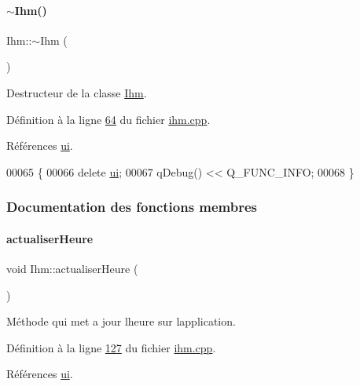 \paragraph{\texorpdfstring{$\sim$\+Ihm()}{~Ihm()}}
{\footnotesize\ttfamily Ihm\+::$\sim$\+Ihm (\begin{DoxyParamCaption}{ }\end{DoxyParamCaption})}



Destructeur de la classe \hyperlink{class_ihm}{Ihm}. 



Définition à la ligne \hyperlink{ihm_8cpp_source_l00064}{64} du fichier \hyperlink{ihm_8cpp_source}{ihm.\+cpp}.



Références \hyperlink{ihm_8h_source_l00052}{ui}.


\begin{DoxyCode}
00065 \{
00066     \textcolor{keyword}{delete} \hyperlink{class_ihm_a0ac5f47856566ceeeca1720109bf70ea}{ui};
00067     qDebug() << Q\_FUNC\_INFO;
00068 \}
\end{DoxyCode}


\subsubsection{Documentation des fonctions membres}
\mbox{\label{class_ihm_ad8b3b13e638ebbfbe8159d00d99ff88f}} 
\paragraph{\texorpdfstring{actualiser\+Heure}{actualiserHeure}}
{\footnotesize\ttfamily void Ihm\+::actualiser\+Heure (\begin{DoxyParamCaption}{ }\end{DoxyParamCaption})\hspace{0.3cm}{\ttfamily [slot]}}



Méthode qui met a jour l\textquotesingle{}heure sur l\textquotesingle{}application. 



Définition à la ligne \hyperlink{ihm_8cpp_source_l00127}{127} du fichier \hyperlink{ihm_8cpp_source}{ihm.\+cpp}.



Références \hyperlink{ihm_8h_source_l00052}{ui}.



